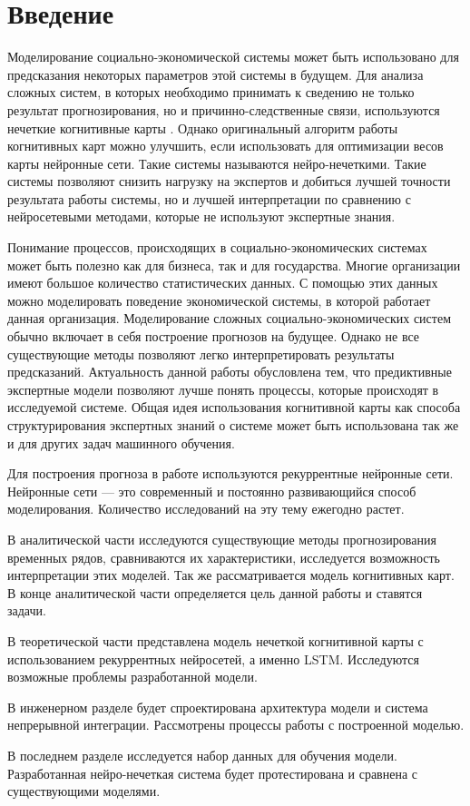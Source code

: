 \chapter*{Введение}
\label{sec:afterwords}

Моделирование социально-экономической системы может быть использовано для предсказания
некоторых параметров этой системы в будущем.
Для анализа сложных систем, в которых необходимо принимать к сведению
не только результат прогнозирования, но и причинно-следственные связи,
используются нечеткие когнитивные карты \cite{osoba2019dags} \cite{kosko1986fuzzy}.
Однако оригинальный алгоритм работы когнитивных карт можно улучшить,
если использовать для оптимизации весов карты нейронные сети.
Такие системы называются нейро-нечеткими.
Такие системы позволяют снизить нагрузку на экспертов и
добиться лучшей точности результата работы системы, но и лучшей интерпретации по сравнению
с нейросетевыми методами, которые не используют экспертные знания.

Понимание процессов, происходящих в социально-экономических системах
может быть полезно как для бизнеса, так и для государства.
Многие организации имеют большое количество статистических данных.
С помощью этих данных можно моделировать поведение
экономической системы, в которой работает данная организация.
Моделирование сложных социально-экономических систем обычно
включает в себя построение прогнозов на будущее.
Однако не все существующие методы позволяют
легко интерпретировать результаты предсказаний.
Актуальность данной работы обусловлена тем, что предиктивные экспертные модели
позволяют лучше понять процессы, которые происходят в
исследуемой системе. Общая идея использования когнитивной карты
как способа структурирования экспертных знаний о системе
может быть использована так же и для других задач машинного обучения.

Для построения прогноза в работе используются рекуррентные нейронные
сети. Нейронные сети --- это современный и постоянно
развивающийся способ моделирования. Количество исследований
на эту тему ежегодно растет.

В аналитической части исследуются существующие методы прогнозирования
временных рядов, сравниваются их характеристики, исследуется
возможность интерпретации этих моделей. Так же рассматривается
модель когнитивных карт. В конце аналитической части определяется
цель данной работы и ставятся задачи.

В теоретической части представлена модель нечеткой когнитивной карты с использованием
рекуррентных нейросетей, а именно LSTM. Исследуются возможные проблемы разработанной модели.

В инженерном разделе будет спроектирована архитектура модели и
система непрерывной интеграции. Рассмотрены процессы работы с построенной моделью.

В последнем разделе исследуется набор данных для обучения модели.
Разработанная нейро-нечеткая система будет протестирована и сравнена
с существующими моделями.